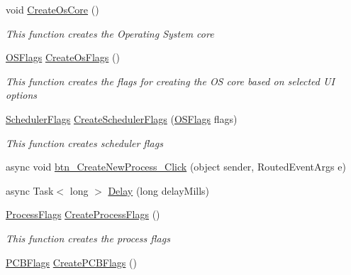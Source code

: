 \begin{DoxyCompactItemize}
\item 
void \hyperlink{class_c_p_u___o_s___simulator_1_1_operating_system_main_window_a61584b7f34a107e1c8c6cbbaff17641d}{Create\+Os\+Core} ()
\begin{DoxyCompactList}\small\item\em This function creates the Operating System core \end{DoxyCompactList}\item 
\hyperlink{struct_c_p_u___o_s___simulator_1_1_operating___system_1_1_o_s_flags}{O\+S\+Flags} \hyperlink{class_c_p_u___o_s___simulator_1_1_operating_system_main_window_aedcaa8273429f3867b3a2419981e4ca1}{Create\+Os\+Flags} ()
\begin{DoxyCompactList}\small\item\em This function creates the flags for creating the O\+S core based on selected U\+I options \end{DoxyCompactList}\item 
\hyperlink{struct_c_p_u___o_s___simulator_1_1_operating___system_1_1_scheduler_flags}{Scheduler\+Flags} \hyperlink{class_c_p_u___o_s___simulator_1_1_operating_system_main_window_affe29a16b5dcb4faa896fd12b87268f6}{Create\+Scheduler\+Flags} (\hyperlink{struct_c_p_u___o_s___simulator_1_1_operating___system_1_1_o_s_flags}{O\+S\+Flags} flags)
\begin{DoxyCompactList}\small\item\em This function creates scheduler flags \end{DoxyCompactList}\item 
async void \hyperlink{class_c_p_u___o_s___simulator_1_1_operating_system_main_window_a07752984a7eedac5dab517b7f57b9af2}{btn\+\_\+\+Create\+New\+Process\+\_\+\+Click} (object sender, Routed\+Event\+Args e)
\item 
async Task$<$ long $>$ \hyperlink{class_c_p_u___o_s___simulator_1_1_operating_system_main_window_a981c8ed38feb78ab874753c641d278d6}{Delay} (long delay\+Mills)
\item 
\hyperlink{struct_c_p_u___o_s___simulator_1_1_operating___system_1_1_process_flags}{Process\+Flags} \hyperlink{class_c_p_u___o_s___simulator_1_1_operating_system_main_window_aa44b77efc3ae2c300ebb19e6854c3290}{Create\+Process\+Flags} ()
\begin{DoxyCompactList}\small\item\em This function creates the process flags \end{DoxyCompactList}\item 
\hyperlink{struct_c_p_u___o_s___simulator_1_1_operating___system_1_1_p_c_b_flags}{P\+C\+B\+Flags} \hyperlink{class_c_p_u___o_s___simulator_1_1_operating_system_main_window_a0994a475aa1e602964f610cce778b117}{Create\+P\+C\+B\+Flags} ()

\end{DoxyCompactItemize}
